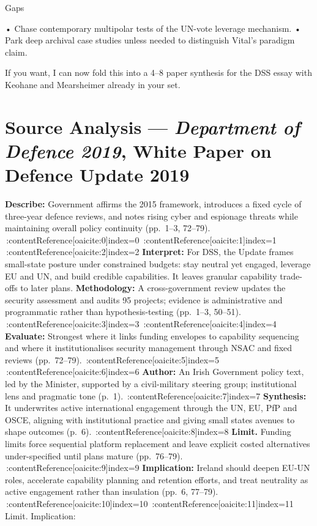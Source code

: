 Gaps

• Chase contemporary multipolar tests of the UN-vote leverage mechanism.
• Park deep archival case studies unless needed to distinguish Vital’s paradigm claim.

If you want, I can now fold this into a 4–8 paper synthesis for the DSS essay with Keohane and Mearsheimer already in your set.

\parencite{WHITE_2019}
\section*{Source Analysis — \textit{Department of Defence 2019}, White Paper on Defence Update 2019}
\textbf{Describe:} Government affirms the 2015 framework, introduces a fixed cycle of three-year defence reviews, and notes rising cyber and espionage threats while maintaining overall policy continuity (pp.~1–3, 72–79). \,:contentReference[oaicite:0]{index=0} \,:contentReference[oaicite:1]{index=1} \,:contentReference[oaicite:2]{index=2}
\textbf{Interpret:} For DSS, the Update frames small-state posture under constrained budgets: stay neutral yet engaged, leverage EU and UN, and build credible capabilities. It leaves granular capability trade-offs to later plans.
\textbf{Methodology:} A cross-government review updates the security assessment and audits 95 projects; evidence is administrative and programmatic rather than hypothesis-testing (pp.~1–3, 50–51). \,:contentReference[oaicite:3]{index=3} \,:contentReference[oaicite:4]{index=4}
\textbf{Evaluate:} Strongest where it links funding envelopes to capability sequencing and where it institutionalises security management through NSAC and fixed reviews (pp.~72–79). \,:contentReference[oaicite:5]{index=5} \,:contentReference[oaicite:6]{index=6}
\textbf{Author:} An Irish Government policy text, led by the Minister, supported by a civil-military steering group; institutional lens and pragmatic tone (p.~1). \,:contentReference[oaicite:7]{index=7}
\textbf{Synthesis:} It underwrites active international engagement through the UN, EU, PfP and OSCE, aligning with institutional practice and giving small states avenues to shape outcomes (p.~6). \,:contentReference[oaicite:8]{index=8}
\textbf{Limit.} Funding limits force sequential platform replacement and leave explicit costed alternatives under-specified until plans mature (pp.~76–79). \,:contentReference[oaicite:9]{index=9}
\textbf{Implication:} Ireland should deepen EU-UN roles, accelerate capability planning and retention efforts, and treat neutrality as active engagement rather than insulation (pp.~6, 77–79). \,:contentReference[oaicite:10]{index=10} \,:contentReference[oaicite:11]{index=11}
Limit. Implication:

